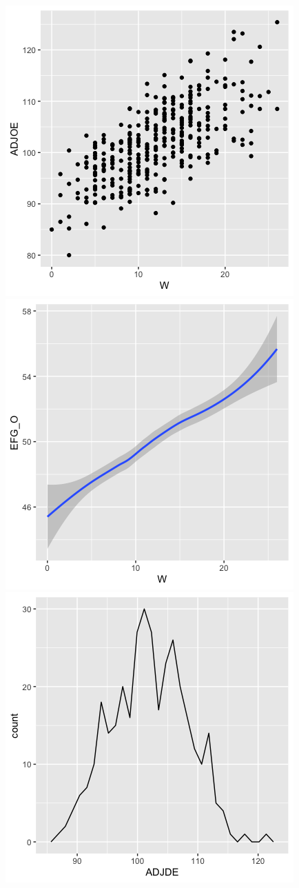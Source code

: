 \documentclass{article}
\begin{document}
\includegraphics{PS6a_Buchman}
\includegraphics{PS6b_Buchman.png}
\includegraphics{PS6c_Buchman.png}
\centering
\end{document}
